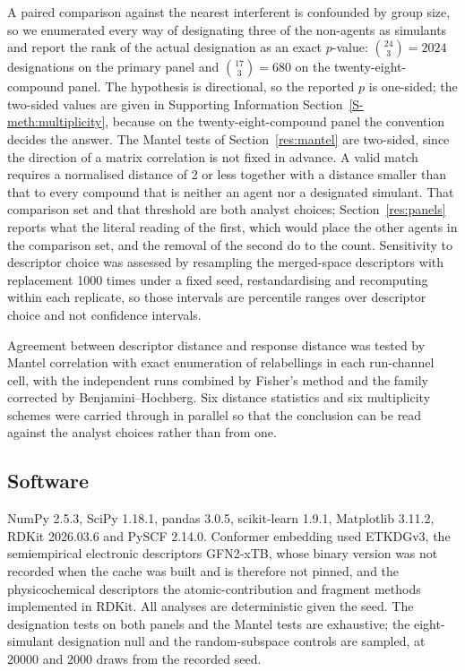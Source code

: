 \documentclass[journal=jacsat,manuscript=article,margin=1in]{achemso}
\begin{document}
A paired comparison against the nearest interferent is confounded by group
size, so we enumerated every way of designating three of the non-agents as
simulants and report the rank of the actual designation as an exact $p$-value:
$\binom{24}{3} = 2024$ designations on the primary panel and
$\binom{17}{3} = 680$ on the twenty-eight-compound panel. The hypothesis is
directional, so the reported $p$ is one-sided; the two-sided values are given
in Supporting Information Section~\ref{S-meth:multiplicity}, because on the
twenty-eight-compound panel the convention decides the answer. The Mantel tests
of Section~\ref{res:mantel} are two-sided, since the direction of a matrix
correlation is not fixed in advance. %
A valid match requires a normalised
distance of 2 or less together with a distance smaller than that to every
compound that is neither an agent nor a designated simulant. That comparison
set and that threshold are both analyst choices; Section~\ref{res:panels}
reports what the literal reading of the first, which would place the other
agents in the comparison set, and the removal of the second do to the count. Sensitivity to
descriptor choice was assessed by resampling the merged-space descriptors with
replacement 1000 times under a fixed seed, restandardising and recomputing
within each replicate, so those intervals are percentile ranges over descriptor
choice and not confidence intervals.

Agreement between descriptor distance and response distance was tested by
Mantel correlation with exact enumeration of relabellings in each run-channel
cell, with the independent runs combined by Fisher's method and the family
corrected by Benjamini--Hochberg. Six distance statistics and six multiplicity
schemes were carried through in parallel so that the conclusion can be read
against the analyst choices rather than from one.

\subsection{Software}
NumPy 2.5.3,\cite{numpy2020} SciPy 1.18.1,\cite{scipy2020} pandas
3.0.5,\cite{mckinney2010} scikit-learn 1.9.1,\cite{sklearn2011} Matplotlib
3.11.2,\cite{matplotlib2007} RDKit 2026.03.6\cite{rdkit} and PySCF
2.14.0.\cite{pyscf2018} Conformer embedding used
ETKDGv3,\cite{riniker2015,wang2020} the semiempirical electronic descriptors
GFN2-xTB,\cite{gfnxtb2017,bannwarth2019} whose binary version was not
recorded when the cache was built and is therefore not pinned, and the
physicochemical descriptors the atomic-contribution and fragment methods
implemented in RDKit.\cite{wildman1999,ertl2000} All analyses are
deterministic given the seed. The designation tests on both panels and the
Mantel tests are exhaustive; the eight-simulant designation null and the
random-subspace controls are sampled, at 20000 and 2000 draws from the
recorded seed.
\end{document}
